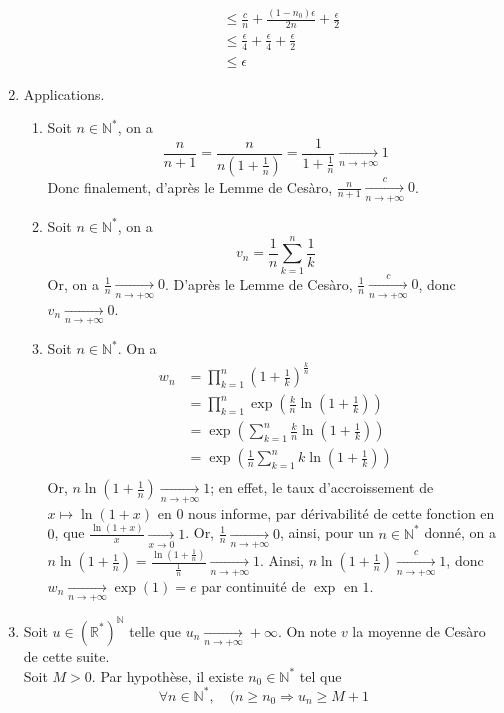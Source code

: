 \documentclass[17pt]{article}
\def\N{\mathbb N}
\def\R{\mathbb R}
\def\implique{\Longrightarrow}
\begin{document}
\begin{enumerate}
\begin{enumerate}
\begin{align*}
							&\leq \frac cn + \frac{(1-n_0)\epsilon}{2n} + \frac\epsilon2\\
							&\leq \frac\epsilon4+\frac\epsilon4+\frac\epsilon2\\
							&\leq \epsilon
			\end{align*}
		\end{enumerate}
		\item Applications.
		\begin{enumerate}
			\item Soit $n\in\N^*$, on a \[\frac n{n+1}=\frac n{n\left(1+\frac 1n\right)}=\frac 1{1+\frac 1n}\xrightarrow[n\rightarrow +\infty ]{}1\]
			Donc finalement, d'après le Lemme de Cesàro, $\boxed{\frac n{n+1}\xrightarrow[n\rightarrow +\infty ]{c}0}$.
			\item Soit $n\in\N^*$, on a \[v_n=\frac1n\sum_{k=1}^n\frac1k\]
			Or, on a $\frac1n\xrightarrow[n\rightarrow +\infty ]{}0$. D'après le Lemme de Cesàro, $\frac1n \xrightarrow[n\rightarrow +\infty ]{c}0$, donc $\boxed{v_n\xrightarrow[n\rightarrow +\infty ]{}0}$.
			\item Soit $n\in\N^*$. On a 
			\begin{align*}
				w_n &= \prod_{k=1}^n\left(1+\frac 1k\right)^{\frac kn}\\
					&= \prod_{k=1}^n\exp\left(\frac kn\ln\left(1+\frac 1k\right)\right)\\
					&= \exp\left(\sum_{k=1}^n\frac kn\ln\left(1+\frac 1k\right)\right)\\
					&= \exp\left(\frac 1n\sum_{k=1}^nk\ln\left(1+\frac 1k\right)\right)\\
			\end{align*}
			Or, $n\ln\left(1+\frac1n\right)\xrightarrow[n\rightarrow +\infty ]{}1$; en effet, le taux d'accroissement de $x\mapsto\ln(1+x)$ en $0$ nous informe, par dérivabilité de cette fonction en $0$, que $\frac{\ln(1+x)}x\xrightarrow[x\rightarrow 0]{}1$. Or, $\frac1n \xrightarrow[n\rightarrow +\infty ]{}0$, ainsi, pour un $n\in\N^*$ donné, on a $n\ln\left(1+\frac1n\right)=\frac{\ln\left(1+\frac1n\right)}{\frac1n}\xrightarrow[n\rightarrow +\infty ]{}1$. Ainsi, $n\ln\left(1+\frac1n\right)\xrightarrow[n\rightarrow +\infty ]{c}1$, donc $\boxed{w_n\xrightarrow[n\rightarrow +\infty ]{}\exp(1)=e}$ par continuité de $\exp$ en $1$.
		\end{enumerate}
		\item Soit $u\in(\R^*)^\N$ telle que $u_n\xrightarrow[n\rightarrow +\infty ]{}+\infty$. On note $v$ la moyenne de Cesàro de cette suite.\\
		Soit $M>0$. Par hypothèse, il existe $n_0\in\N^*$ tel que \[\forall n\in\N^*,\quad (n\geq n_0\implique u_n\geq M+1\]

\end{enumerate}
\end{document}
